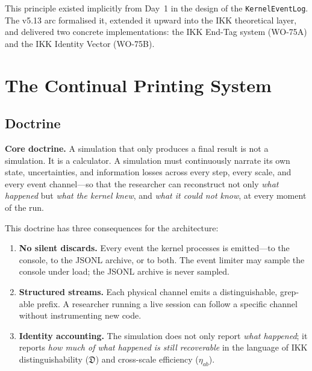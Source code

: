 \documentclass[11pt,a4paper]{article}
\theoremstyle{definition}
\newcommand{\Dfrak}{\mathfrak{D}}
\newcommand{\etaab}{\eta_{ab}}
\begin{document}
This principle existed implicitly from Day~1 in the design of the
\texttt{KernelEventLog}.  The v5.13 arc formalised it, extended it upward into
the IKK theoretical layer, and delivered two concrete implementations:
the IKK End-Tag system (WO-75A) and the IKK Identity Vector (WO-75B).

\section{The Continual Printing System}

\subsection{Doctrine}

\begin{mdframed}[style=doctrinebox]
\textbf{Core doctrine.}\quad
A simulation that only produces a final result is not a simulation.
It is a calculator.  A simulation must continuously narrate its own state,
uncertainties, and information losses across every step, every scale, and every
event channel---so that the researcher can reconstruct not only \emph{what
happened} but \emph{what the kernel knew}, and \emph{what it could not know},
at every moment of the run.
\end{mdframed}

\vspace{4pt}
This doctrine has three consequences for the architecture:

\begin{enumerate}[leftmargin=2em]
  \item \textbf{No silent discards.}  Every event the kernel processes is
	emitted---to the console, to the JSONL archive, or to both.  The event
	limiter may sample the console under load; the JSONL archive is never
	sampled.

  \item \textbf{Structured streams.}  Each physical channel emits a
	distinguishable, grep-able prefix.  A researcher running a live session can
	follow a specific channel without instrumenting new code.

  \item \textbf{Identity accounting.}  The simulation does not only report
	\emph{what happened}; it reports \emph{how much of what happened is still
	recoverable} in the language of IKK distinguishability
	($\Dfrak$) and cross-scale efficiency ($\etaab$).
\end{enumerate}
\end{document}
